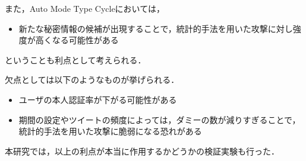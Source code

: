また，Auto Mode Type Cycleにおいては，
\begin{itemize}
  \item 新たな秘密情報の候補が出現することで，統計的手法を用いた攻撃に対し強度が高くなる可能性がある
\end{itemize}
ということも利点として考えられる．

欠点としては以下のようなものが挙げられる．
\begin{itemize}
  \item ユーザの本人認証率が下がる可能性がある
  \item 期間の設定やツイートの頻度によっては，ダミーの数が減りすぎることで，統計的手法を用いた攻撃に脆弱になる恐れがある
\end{itemize}

本研究では，以上の利点が本当に作用するかどうかの検証実験も行った．

\newpage

